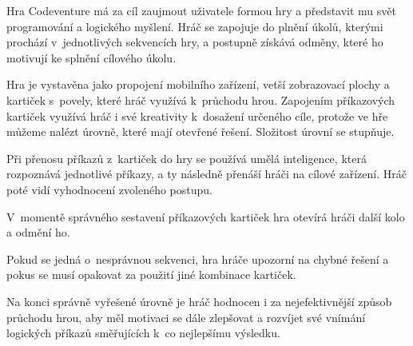 Hra Codeventure má za cíl zaujmout uživatele formou hry a představit mu svět programování a logického myšlení. Hráč se zapojuje do plnění úkolů, kterými prochází v~jednotlivých sekvencích hry, a postupně získává odměny, které ho motivují ke splnění cílového úkolu.\par
Hra je vystavěna jako propojení mobilního zařízení, vetší zobrazovací plochy a kartiček s~povely, které hráč využívá k~průchodu hrou. Zapojením příkazových kartiček využívá hráč i své kreativity k~dosažení určeného cíle, protože ve hře můžeme nalézt úrovně, které mají otevřené řešení. Složitost úrovní se stupňuje.\par
Při přenosu příkazů z~kartiček do hry se používá umělá inteligence, která rozpoznává jednotlivé příkazy, a ty následně přenáší hráči na cílové zařízení. Hráč poté vidí vyhodnocení zvoleného postupu.\par
V~momentě správného sestavení příkazových kartiček hra otevírá hráči další kolo a odmění ho.\par
Pokud se jedná o~nesprávnou sekvenci, hra hráče upozorní na chybné řešení a pokus se musí opakovat za použití jiné kombinace kartiček.\par
Na konci správně vyřešené úrovně je hráč hodnocen i za nejefektivnější způsob průchodu hrou, aby měl motivaci se dále zlepšovat a rozvíjet své vnímání logických příkazů směřujících k~co nejlepšímu výsledku.